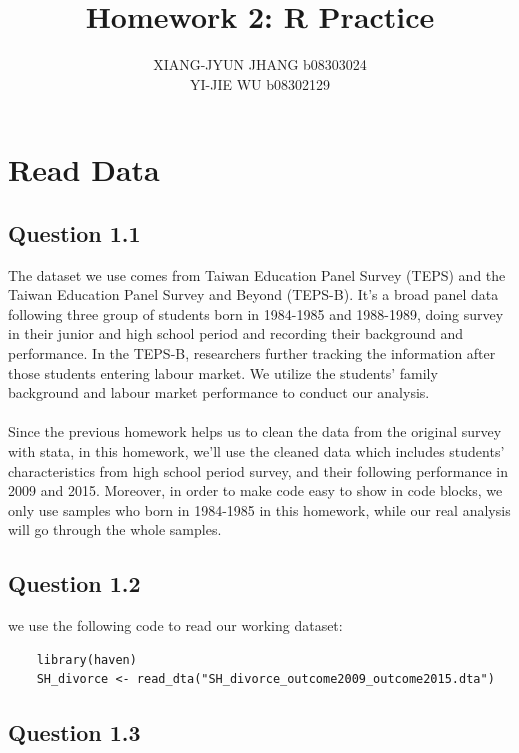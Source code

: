 \documentclass[11pt, letterpaper]{article}
\title{Homework 2: R Practice}
\author{XIANG-JYUN JHANG b08303024 \\ YI-JIE WU b08302129}
\begin{document}
\maketitle



\section{Read Data}


\subsection*{Question 1.1}

The dataset we use comes from Taiwan Education Panel Survey (TEPS) and the Taiwan Education Panel Survey and Beyond (TEPS-B).
It's a broad panel data following three group of students born in 1984-1985 and 1988-1989, doing survey in their junior and high school period and recording their background and performance.  
In the TEPS-B, researchers further tracking the information after those students entering labour market.  We utilize the students' family background and labour market performance to conduct our analysis. 
\\
\\
Since the previous homework helps us to clean the data from the original survey with stata, in this homework, we'll use the cleaned data which includes students' characteristics from high school period survey, and their following performance in 2009 and 2015. Moreover, in order to make code easy to show in code blocks, we only use samples who born in 1984-1985 in this homework, while our real analysis will go through the whole samples.


\subsection*{Question 1.2}

we use the following code to read our working dataset:

\begin{lstlisting}
    library(haven)
    SH_divorce <- read_dta("SH_divorce_outcome2009_outcome2015.dta")
\end{lstlisting}


\subsection*{Question 1.3}
\end{document}
